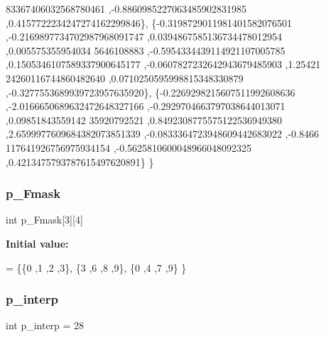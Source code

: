 \begin{DoxyCode}
      83367406032568780461 ,-0.8860985227063485902831985 ,0.4157722234247274162299846\},
\{-0.3198729011981401582076501 ,-0.2169897734702987968091747 ,0.0394867585136734478012954 ,0.005575355954034
      5646108883 ,-0.5954334439114921107005785 ,0.1505346107589337900645177 ,-0.0607827232642943679485903 ,1.25421
      24260116744860482640 ,0.0710250595998815348330879 ,-0.3277553689939723957635920\},
\{-0.2269298215607511992608636 ,-2.0166650689632472648327166 ,-0.2929704663797038644013071 ,0.09851843559142
      35920792521 ,0.8492308775575122536949380 ,2.6599977609684382073851339 ,-0.0833364723948609442683022 ,-0.8466
      117641926756975934154 ,-0.5625810600048966048092325 ,0.4213475793787615497620891\}
\}
\end{DoxyCode}
\mbox{\label{a00452_a9e8002d4e70ec8468d74e26db0e92bda}} 
\subsubsection{\texorpdfstring{p\+\_\+\+Fmask}{p\_Fmask}}
{\footnotesize\ttfamily int p\+\_\+\+Fmask\mbox{[}3\mbox{]}\mbox{[}4\mbox{]}}

{\bfseries Initial value\+:}
\begin{DoxyCode}
= \{\{0 ,1 ,2 ,3\},
\{3 ,6 ,8 ,9\},
\{0 ,4 ,7 ,9\}
\}
\end{DoxyCode}
\mbox{\label{a00452_a240743866e0fdfc2ade414eedd98fde2}} 
\subsubsection{\texorpdfstring{p\+\_\+interp}{p\_interp}}
{\footnotesize\ttfamily int p\+\_\+interp = 28}

\mbox{\label{a00452_a6eaa3dd7fcbdb35ab771367e35afa96d}} 
